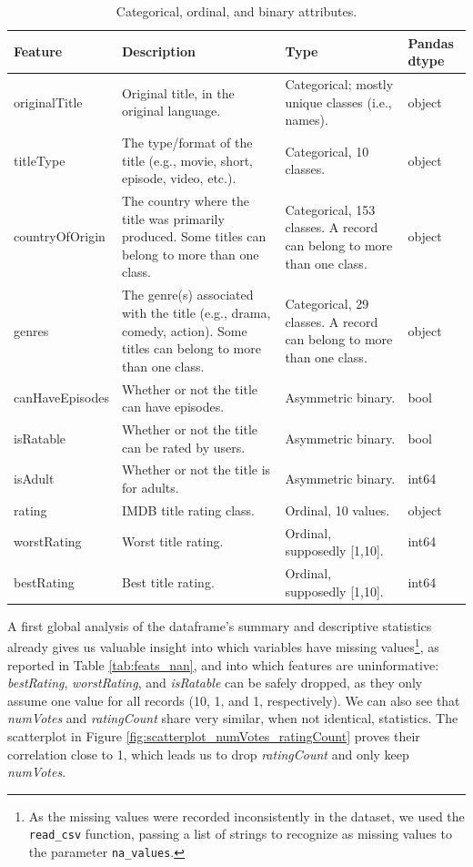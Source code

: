 \begin{table}[h]
    \centering
    \renewcommand{\arraystretch}{1.2}
    \scriptsize
    \begin{tabular}{|p{2cm}|p{4.5cm}|p{3cm}|p{1.5cm}|}
        \hline
        \textbf{Feature} & \textbf{Description} & \textbf{Type} & \textbf{Pandas dtype} \\ \hline
        originalTitle & Original title, in the original language. & Categorical; mostly unique classes (i.e., names). & object \\ \hline
        titleType & The type/format of the title (e.g., movie, short, episode, video, etc.). & Categorical, 10 classes. & object \\ \hline
        countryOfOrigin & The country where the title was primarily produced. Some titles can belong to more than one class. & Categorical, 153 classes. A record can belong to more than one class. & object \\ \hline
        genres & The genre(s) associated with the title (e.g., drama, comedy, action). Some titles can belong to more than one class. & Categorical, 29 classes. A record can belong to more than one class. & object \\ \hline
        canHaveEpisodes & Whether or not the title can have episodes. & Asymmetric binary. & bool \\ \hline
        isRatable & Whether or not the title can be rated by users. & Asymmetric binary. & bool \\ \hline
        isAdult & Whether or not the title is for adults. & Asymmetric binary. & int64 \\ \hline
        rating & IMDB title rating class. & Ordinal, 10 values. & object \\ \hline
        worstRating & Worst title rating. & Ordinal, supposedly [1,10]. & int64 \\ \hline
        bestRating & Best title rating. & Ordinal, supposedly [1,10]. & int64 \\ \hline
    \end{tabular}
    \caption{Categorical, ordinal, and binary attributes.}
    \label{tab:original_vars_cat}
\end{table}

A first global analysis of the dataframe's summary and descriptive statistics already gives us valuable insight into which variables have missing values\footnote{As the missing values were recorded inconsistently in the dataset, we used the \texttt{read\_csv} function, passing a list of strings to recognize as missing values to the parameter \texttt{na\_values}.}, as reported in Table \ref{tab:feats_nan}, and into which features are uninformative: \textit{bestRating}, \textit{worstRating}, and \textit{isRatable} can be safely dropped, as they only assume one value for all records (10, 1, and 1, respectively). We can also see that \textit{numVotes} and \textit{ratingCount} share very similar, when not identical, statistics. The scatterplot in Figure \ref{fig:scatterplot_numVotes_ratingCount} proves their correlation close to 1, which leads us to drop \textit{ratingCount} and only keep \textit{numVotes}.

